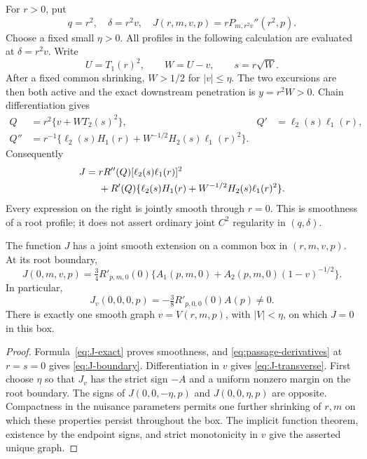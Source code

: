 For \(r>0\), put
\begin{equation}\label{eq:J-definition}
 q=r^2,\quad \delta=r^2v,\quad
 J(r,m,v,p)=rP_{m,r^2v}''(r^2,p).
\end{equation}
Choose a fixed small \(\eta>0\). All profiles in the following
calculation are evaluated at \(\delta=r^2v\).
Write
\[
 U=T_1(r)^2,\qquad W=U-v,\qquad s=r\sqrt{W}.
\]
After a fixed common shrinking, \(W>1/2\) for \(|v|\le\eta\).
The two excursions are then both active and the exact downstream
penetration is \(y=r^2W>0\). Chain differentiation gives
\begin{align}
 Q&=r^2\{v+WT_2(s)^2\},&
 Q'&=\ell_2(s)\ell_1(r),\label{eq:Q-outer}\\
 Q''&=r^{-1}\{\ell_2(s)H_1(r)
       +W^{-1/2}H_2(s)\ell_1(r)^2\}.\label{eq:Q-curvature}
\end{align}
Consequently
\begin{align}\label{eq:J-exact}
 J={}&rR''(Q)[\ell_2(s)\ell_1(r)]^2\\
 &+R'(Q)\{\ell_2(s)H_1(r)
               +W^{-1/2}H_2(s)\ell_1(r)^2\}.\notag
\end{align}
Every expression on the right is jointly smooth through \(r=0\).
This is smoothness of a root profile; it does not assert ordinary
joint \(C^2\) regularity in \((q,\delta)\).

\begin{lemma}\label{lem:curvature-profile}
The function \(J\) has a joint smooth extension on a common box
in \((r,m,v,p)\). At its root boundary,
\begin{equation}\label{eq:J-boundary}
 J(0,m,v,p)
 =\tfrac34 R'_{p,m,0}(0)
     \{A_1(p,m,0)+A_2(p,m,0)(1-v)^{-1/2}\}.
\end{equation}
In particular,
\begin{equation}\label{eq:J-transverse}
 J_v(0,0,0,p)=-\tfrac38 R'_{p,0,0}(0)A(p)\ne0.
\end{equation}
There is exactly one smooth graph \(v=V(r,m,p)\), with
\(|V|<\eta\), on which \(J=0\) in this box.
\end{lemma}

\begin{proof}
Formula~\eqref{eq:J-exact} proves smoothness, and
\eqref{eq:passage-derivatives} at \(r=s=0\) gives
\eqref{eq:J-boundary}. Differentiation in \(v\) gives
\eqref{eq:J-transverse}. First choose \(\eta\) so that \(J_v\) has
the strict sign \(-A\) and a uniform nonzero margin on the root
boundary. The signs of \(J(0,0,-\eta,p)\) and
\(J(0,0,\eta,p)\) are opposite. Compactness in the nuisance
parameters permits one further shrinking of \(r,m\) on which these
properties persist throughout the box. The implicit function theorem,
existence by the endpoint signs, and strict monotonicity in \(v\)
give the asserted unique graph.
\end{proof}

